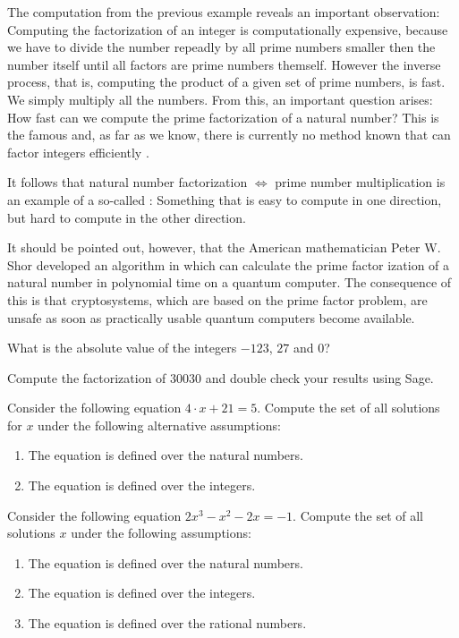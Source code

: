 The computation from the previous example reveals an important observation: Computing the factorization of an integer is computationally expensive, because we have to divide the number repeadly by all prime numbers smaller then the number itself until all factors are prime numbers themself. However the inverse process, that is, computing the product of a given set of prime numbers, is fast. We simply multiply all the numbers. From this, an important question arises: How fast can we compute the prime factorization of a natural number? This is the famous  and, as far as we know, there is currently no method known that can factor integers efficiently .

It follows that natural number factorization $\Leftrightarrow$ prime number multiplication is an example of a so-called  : Something that is easy to compute in one direction, but hard to compute in the other direction. 

It should be pointed out, however, that the American mathematician Peter W. Shor developed an algorithm in \citeyear{shor94} which can calculate the prime factor ization of a natural number in polynomial time on a quantum computer. The consequence of this is that cryptosystems, which are based on the prime factor problem, are unsafe as soon as practically usable quantum computers become available.

\begin{exercise}
What is the absolute value of the integers $-123$, $27$ and $0$?
\end{exercise}
\begin{exercise}
Compute the factorization of $30030$ and double check your results using Sage.
\end{exercise}
\begin{exercise}
Consider the following equation $4\cdot x + 21 = 5$. Compute the set of all solutions for $x$ under the following alternative assumptions: 
\begin{enumerate}
\item The equation is defined over the natural numbers. 
\item The equation is defined over the integers.
\end{enumerate}
\end{exercise}
\begin{exercise}
Consider the following equation $2 x^3 - x^2 - 2 x = - 1$. Compute the set of all solutions $x$ under the following assumptions: 
\begin{enumerate}
\item The equation is defined over the natural numbers. 
\item The equation is defined over the integers.
\item The equation is defined over the rational numbers.
\end{enumerate}
\end{exercise}

